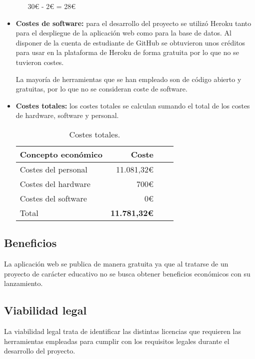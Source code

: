\begin{itemize}
\begin{itemize}
    \begin{center}
        30€ - 2€ = 28€
    \end{center}
\end{itemize}

\item \textbf{Costes de software:} para el desarrollo del proyecto se utilizó Heroku tanto para el despliegue de la aplicación web como para la base de datos. Al disponer de la cuenta de estudiante de GitHub se obtuvieron unos créditos para usar en la plataforma de Heroku de forma gratuita por lo que no se tuvieron costes.

La mayoría de herramientas que se han empleado son de código abierto y gratuitas, por lo que no se consideran coste de software.

\item \textbf{Costes totales:} los costes totales se calculan sumando el total de los costes de hardware, software y personal.
    \begin{table}[h]
    \centering
    \begin{tabular}{p{6cm}rrr}
        \hline
        \textbf{Concepto económico} & \textbf{Coste} \\
        \hline
        Costes del personal & 11.081,32€ \\
        Costes del hardware & 700€ \\
        Costes del software & 0€ \\
        \hline
        Total  & {\textbf{11.781,32€}}\\
        \hline
    \end{tabular}
    \caption{Costes totales.}
    \label{tab:costes-totales}
\end{table}
\end{itemize}

\subsection{Beneficios}
La aplicación web se publica de manera gratuita ya que al tratarse de un proyecto de carácter educativo no se busca obtener beneficios económicos con su lanzamiento.

\subsection{Viabilidad legal}
La viabilidad legal trata de identificar las distintas licencias que requieren las herramientas empleadas para  cumplir con los requisitos legales durante el desarrollo del proyecto.

